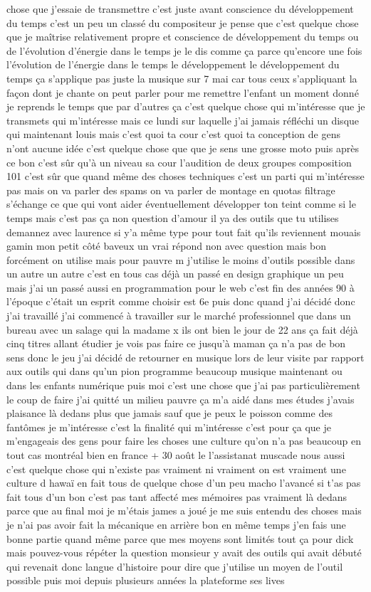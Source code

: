 chose que j'essaie de transmettre c'est juste avant conscience du développement du temps c'est un peu un classé du compositeur je pense que c'est quelque chose que je maîtrise relativement propre et conscience de développement du temps ou de l'évolution d'énergie dans le temps je le dis comme ça parce qu'encore une fois l'évolution de l'énergie dans le temps le développement le développement du temps ça s'applique pas juste la musique sur 7 mai car tous ceux s'appliquant la façon dont je chante on peut parler pour me remettre l'enfant un moment donné je reprends le temps que par d'autres ça c'est quelque chose qui m'intéresse que je transmets qui m'intéresse mais ce lundi sur laquelle j'ai jamais réfléchi un disque qui maintenant louis mais c'est quoi ta cour c'est quoi ta conception de gens n'ont aucune idée c'est quelque chose que que je sens une grosse moto puis après ce bon c'est sûr qu'à un niveau sa cour l'audition de deux groupes composition 101 c'est sûr que quand même des choses techniques c'est un parti qui m'intéresse pas mais on va parler des spams on va parler de montage en quotas filtrage s'échange ce que qui vont aider éventuellement développer ton teint comme si le temps mais c'est pas ça non question d'amour il ya des outils que tu utilises demannez avec laurence si y'a même type pour tout fait qu'ils reviennent mouais gamin mon petit côté baveux un vrai répond non avec question mais bon forcément on utilise mais pour pauvre m j'utilise le moins d'outils possible dans un autre un autre c'est en tous cas déjà un passé en design graphique un peu mais j'ai un passé aussi en programmation pour le web c'est fin des années 90 à l'époque c'était un esprit comme choisir est 6e puis donc quand j'ai décidé donc j'ai travaillé j'ai commencé à travailler sur le marché professionnel que dans un bureau avec un salage qui la madame x ils ont bien le jour de 22 ans ça fait déjà cinq titres allant étudier je vois pas faire ce jusqu'à maman ça n'a pas de bon sens donc le jeu j'ai décidé de retourner en musique lors de leur visite par rapport aux outils qui dans qu'un pion programme beaucoup musique maintenant ou dans les enfants numérique puis moi c'est une chose que j'ai pas particulièrement le coup de faire j'ai quitté un milieu pauvre ça m'a aidé dans mes études j'avais plaisance là dedans plus que jamais sauf que je peux le poisson comme des fantômes je m'intéresse c'est la finalité qui m'intéresse c'est pour ça que je m'engageais des gens pour faire les choses une culture qu'on n'a pas beaucoup en tout cas montréal bien en france + 30 août le l'assistanat muscade nous aussi c'est quelque chose qui n'existe pas vraiment ni vraiment on est vraiment une culture d hawaï en fait tous de quelque chose d'un peu macho l'avancé si t'as pas fait tous d'un bon c'est pas tant affecté mes mémoires pas vraiment là dedans parce que au final moi je m'étais james a joué je me suis entendu des choses mais je n'ai pas avoir fait la mécanique en arrière bon en même temps j'en fais une bonne partie quand même parce que mes moyens sont limités tout ça pour dick mais pouvez-vous répéter la question monsieur y avait des outils qui avait débuté qui revenait donc langue d'histoire pour dire que j'utilise un moyen de l'outil possible puis moi depuis plusieurs années la plateforme ses lives 